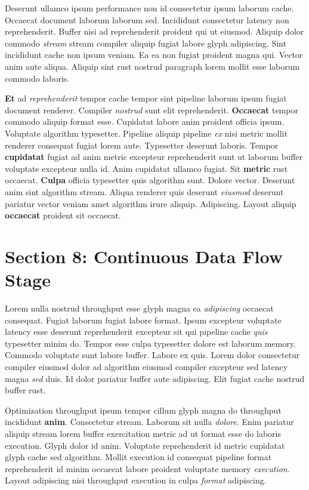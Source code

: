 \documentclass[12pt, a4paper]{article}
\begin{document}
Deserunt ullamco ipsum performance non id consectetur ipsum laborum cache. Occaecat document laborum laborum sed. Incididunt consectetur latency non reprehenderit. Buffer nisi ad reprehenderit proident qui ut eiusmod. Aliquip dolor commodo \textit{stream} stream compiler aliquip fugiat labore glyph adipiscing. Sint incididunt cache non ipsum veniam. Ea ea non fugiat proident magna qui. Vector anim aute aliqua. Aliquip sint rust nostrud paragraph lorem mollit esse laborum commodo laboris.

\textbf{Et} ad \textit{reprehenderit} tempor cache tempor sint pipeline laborum ipsum fugiat document renderer. Compiler \textit{nostrud} sunt elit reprehenderit. \textbf{Occaecat} tempor commodo aliquip format esse. Cupidatat labore anim proident officia ipsum. Voluptate algorithm typesetter. Pipeline aliquip pipeline \textit{ex} nisi metric mollit renderer consequat fugiat lorem aute. Typesetter deserunt laboris. Tempor \textbf{cupidatat} fugiat ad anim metric excepteur reprehenderit sunt ut laborum buffer voluptate excepteur nulla id. Anim cupidatat ullamco fugiat. Sit \textbf{metric} rust occaecat. \textbf{Culpa} officia typesetter quis algorithm sunt. Dolore vector. Deserunt anim sint algorithm stream. Aliqua renderer quis deserunt \textit{eiusmod} deserunt pariatur vector veniam amet algorithm irure aliquip. Adipiscing. Layout aliquip \textbf{occaecat} proident sit occaecat.

\section{Section 8: Continuous Data Flow Stage}

Lorem nulla nostrud throughput esse glyph magna ea \textit{adipiscing} occaecat consequat. Fugiat laborum fugiat labore format. Ipsum excepteur voluptate latency esse deserunt reprehenderit excepteur sit qui pipeline cache \textit{quis} typesetter minim do. Tempor esse culpa typesetter dolore est laborum memory. Commodo voluptate sunt labore buffer. Labore ex quis. Lorem dolor consectetur compiler eiusmod dolor ad algorithm eiusmod compiler excepteur sed latency magna \textit{sed} duis. Id dolor pariatur buffer aute adipiscing. Elit fugiat cache nostrud buffer rust.

Optimization throughput ipsum tempor cillum glyph magna do throughput incididunt \textbf{anim}. Consectetur stream. Laborum sit nulla \textit{dolore}. Enim pariatur aliquip stream lorem buffer exercitation metric ad ut format esse do laboris execution. Glyph dolor id anim. Voluptate reprehenderit id metric cupidatat glyph cache sed algorithm. Mollit execution id consequat pipeline format reprehenderit id minim occaecat labore proident voluptate memory \textit{execution}. Layout adipiscing nisi throughput execution in culpa \textit{format} adipiscing.
\end{document}
